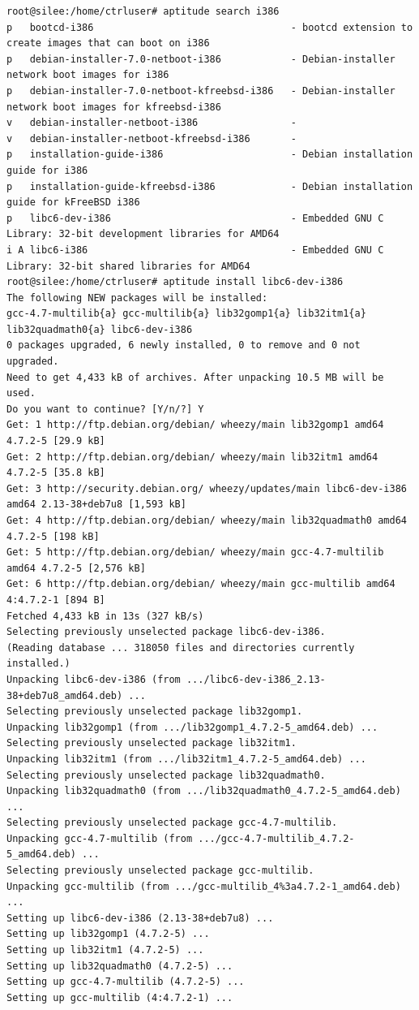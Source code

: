 \documentclass[11pt
  , a4paper
  , article
  , oneside
]{memoir}
\begin{document}
\begin{lstlisting}[style=termstyle]
root@silee:/home/ctrluser# aptitude search i386
p   bootcd-i386                                  - bootcd extension to create images that can boot on i386            
p   debian-installer-7.0-netboot-i386            - Debian-installer network boot images for i386                      
p   debian-installer-7.0-netboot-kfreebsd-i386   - Debian-installer network boot images for kfreebsd-i386             
v   debian-installer-netboot-i386                -                                                                    
v   debian-installer-netboot-kfreebsd-i386       -                                                                    
p   installation-guide-i386                      - Debian installation guide for i386                                 
p   installation-guide-kfreebsd-i386             - Debian installation guide for kFreeBSD i386                        
p   libc6-dev-i386                               - Embedded GNU C Library: 32-bit development libraries for AMD64     
i A libc6-i386                                   - Embedded GNU C Library: 32-bit shared libraries for AMD64          
root@silee:/home/ctrluser# aptitude install libc6-dev-i386
The following NEW packages will be installed:
gcc-4.7-multilib{a} gcc-multilib{a} lib32gomp1{a} lib32itm1{a} lib32quadmath0{a} libc6-dev-i386 
0 packages upgraded, 6 newly installed, 0 to remove and 0 not upgraded.
Need to get 4,433 kB of archives. After unpacking 10.5 MB will be used.
Do you want to continue? [Y/n/?] Y
Get: 1 http://ftp.debian.org/debian/ wheezy/main lib32gomp1 amd64 4.7.2-5 [29.9 kB]
Get: 2 http://ftp.debian.org/debian/ wheezy/main lib32itm1 amd64 4.7.2-5 [35.8 kB]
Get: 3 http://security.debian.org/ wheezy/updates/main libc6-dev-i386 amd64 2.13-38+deb7u8 [1,593 kB]
Get: 4 http://ftp.debian.org/debian/ wheezy/main lib32quadmath0 amd64 4.7.2-5 [198 kB]
Get: 5 http://ftp.debian.org/debian/ wheezy/main gcc-4.7-multilib amd64 4.7.2-5 [2,576 kB]
Get: 6 http://ftp.debian.org/debian/ wheezy/main gcc-multilib amd64 4:4.7.2-1 [894 B]
Fetched 4,433 kB in 13s (327 kB/s)
Selecting previously unselected package libc6-dev-i386.
(Reading database ... 318050 files and directories currently installed.)
Unpacking libc6-dev-i386 (from .../libc6-dev-i386_2.13-38+deb7u8_amd64.deb) ...
Selecting previously unselected package lib32gomp1.
Unpacking lib32gomp1 (from .../lib32gomp1_4.7.2-5_amd64.deb) ...
Selecting previously unselected package lib32itm1.
Unpacking lib32itm1 (from .../lib32itm1_4.7.2-5_amd64.deb) ...
Selecting previously unselected package lib32quadmath0.
Unpacking lib32quadmath0 (from .../lib32quadmath0_4.7.2-5_amd64.deb) ...
Selecting previously unselected package gcc-4.7-multilib.
Unpacking gcc-4.7-multilib (from .../gcc-4.7-multilib_4.7.2-5_amd64.deb) ...
Selecting previously unselected package gcc-multilib.
Unpacking gcc-multilib (from .../gcc-multilib_4%3a4.7.2-1_amd64.deb) ...
Setting up libc6-dev-i386 (2.13-38+deb7u8) ...
Setting up lib32gomp1 (4.7.2-5) ...
Setting up lib32itm1 (4.7.2-5) ...
Setting up lib32quadmath0 (4.7.2-5) ...
Setting up gcc-4.7-multilib (4.7.2-5) ...
Setting up gcc-multilib (4:4.7.2-1) ...
\end{lstlisting}
\end{document}
